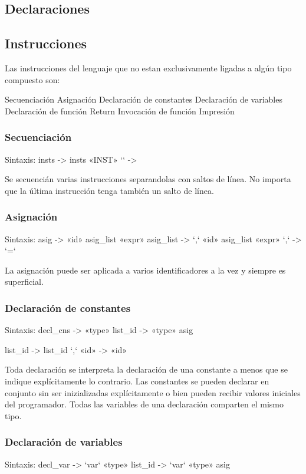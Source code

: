 \documentclass[12pt, spanish]{report}
\begin{document}
\subsection{Declaraciones}
\label{sec:decl}

\subsection{Instrucciones}
\label{sec:instr}
Las instrucciones del lenguaje que no estan exclusivamente
ligadas a algún tipo compuesto son:
\begin{itemize}
Secuenciación
Asignación
Declaraci\'on de constantes
Declaraci\'on de variables
Declaraci\'on de funci\'on
Return
Invocación de funci\'on
Impresi\'on
\end{itemize}

\subsubsection{Secuenciaci\'on}
Sintaxis:
  insts     -> insts «INST» `\n` 
            -> 

Se secuenci\'an varias instrucciones separandolas con saltos
de l\'inea. No importa que la \'ultima instrucci\'on tenga
tambi\'en un salto de l\'inea.

\subsubsection{Asignación}
Sintaxis:
  asig      -> «id» asig_list «expr» 
  asig_list -> `,` «id» asig_list «expr» `,`
            -> `=`

La asignación puede ser aplicada a varios identificadores a la
vez y siempre es superficial.

\subsubsection{Declaraci\'on de constantes}
Sintaxis:
  decl_cns -> «type» list_id 
           -> «type» asig

  list_id  -> list_id `,` «id»
           -> «id»

Toda declaración se interpreta la declaración de una constante a
menos que se indique explícitamente lo contrario.%
Las constantes se pueden declarar en conjunto sin ser inizializadas
explícitamente o bien pueden recibir valores iniciales del
programador. Todas las variables de una declaración comparten el
mismo tipo.

\subsubsection{Declaraci\'on de variables}
Sintaxis:
  decl_var -> `var` «type» list_id 
           -> `var` «type» asig
\end{document}
